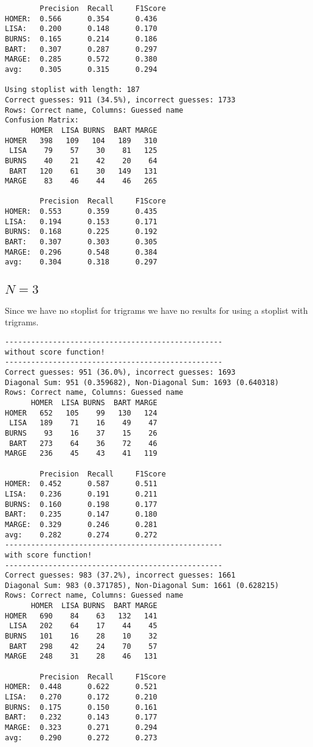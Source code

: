 \documentclass[a4paper]{article}
\begin{document}
\begin{verbatim}
        Precision  Recall     F1Score    
HOMER:  0.566      0.354      0.436      
LISA:   0.200      0.148      0.170      
BURNS:  0.165      0.214      0.186      
BART:   0.307      0.287      0.297      
MARGE:  0.285      0.572      0.380      
avg:    0.305      0.315      0.294      

Using stoplist with length: 187
Correct guesses: 911 (34.5%), incorrect guesses: 1733
Rows: Correct name, Columns: Guessed name
Confusion Matrix:
      HOMER  LISA BURNS  BART MARGE 
HOMER   398   109   104   189   310 
 LISA    79    57    30    81   125 
BURNS    40    21    42    20    64 
 BART   120    61    30   149   131 
MARGE    83    46    44    46   265 

        Precision  Recall     F1Score    
HOMER:  0.553      0.359      0.435      
LISA:   0.194      0.153      0.171      
BURNS:  0.168      0.225      0.192      
BART:   0.307      0.303      0.305      
MARGE:  0.296      0.548      0.384      
avg:    0.304      0.318      0.297      
\end{verbatim}

\subsection{$N=3$}
Since we have no stoplist for trigrams we have no results for using a stoplist
with trigrams.
\begin{verbatim}
--------------------------------------------------
without score function!
--------------------------------------------------
Correct guesses: 951 (36.0%), incorrect guesses: 1693
Diagonal Sum: 951 (0.359682), Non-Diagonal Sum: 1693 (0.640318)
Rows: Correct name, Columns: Guessed name
      HOMER  LISA BURNS  BART MARGE 
HOMER   652   105    99   130   124 
 LISA   189    71    16    49    47 
BURNS    93    16    37    15    26 
 BART   273    64    36    72    46 
MARGE   236    45    43    41   119 

        Precision  Recall     F1Score    
HOMER:  0.452      0.587      0.511      
LISA:   0.236      0.191      0.211      
BURNS:  0.160      0.198      0.177      
BART:   0.235      0.147      0.180      
MARGE:  0.329      0.246      0.281      
avg:    0.282      0.274      0.272      
--------------------------------------------------
with score function!
--------------------------------------------------
Correct guesses: 983 (37.2%), incorrect guesses: 1661
Diagonal Sum: 983 (0.371785), Non-Diagonal Sum: 1661 (0.628215)
Rows: Correct name, Columns: Guessed name
      HOMER  LISA BURNS  BART MARGE 
HOMER   690    84    63   132   141 
 LISA   202    64    17    44    45 
BURNS   101    16    28    10    32 
 BART   298    42    24    70    57 
MARGE   248    31    28    46   131 

        Precision  Recall     F1Score    
HOMER:  0.448      0.622      0.521      
LISA:   0.270      0.172      0.210      
BURNS:  0.175      0.150      0.161      
BART:   0.232      0.143      0.177      
MARGE:  0.323      0.271      0.294      
avg:    0.290      0.272      0.273      
\end{verbatim}
\end{document}
